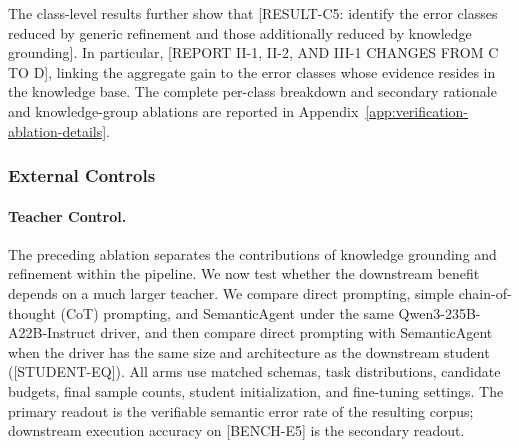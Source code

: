 \documentclass[letterpaper,journal]{IEEEtran}
\begin{document}
The class-level results further show that [RESULT-C5: identify the error classes reduced by generic refinement and those additionally reduced by knowledge grounding]. In particular, [REPORT II-1, II-2, AND III-1 CHANGES FROM C TO D], linking the aggregate gain to the error classes whose evidence resides in the knowledge base. The complete per-class breakdown and secondary rationale and knowledge-group ablations are reported in Appendix~\ref{app:verification-ablation-details}.



\subsubsection{External Controls}

\paragraph{Teacher Control.}
\label{subsec:teacher-control}

The preceding ablation separates the contributions of knowledge grounding and refinement within the pipeline. We now test whether the downstream benefit depends on a much larger teacher. We compare direct prompting, simple chain-of-thought (CoT) prompting, and SemanticAgent under the same Qwen3-235B-A22B-Instruct driver, and then compare direct prompting with SemanticAgent when the driver has the same size and architecture as the downstream student ([STUDENT-EQ]). All arms use matched schemas, task distributions, candidate budgets, final sample counts, student initialization, and fine-tuning settings. The primary readout is the verifiable semantic error rate of the resulting corpus; downstream execution accuracy on [BENCH-E5] is the secondary readout.
\end{document}
